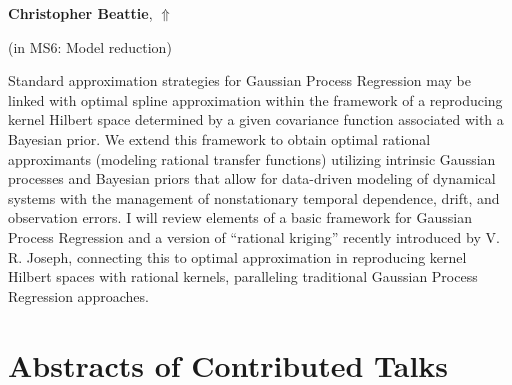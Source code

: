 \documentclass[ILAS2025-program.tex]{subfiles}
\begin{document}
     \hypertarget{down0211}{}\begin{ilasabstract}
    
    \textbf{Christopher Beattie},  \hfill \hyperlink{up0211}{$\Uparrow$}
    
    (in {\color{mstitle}MS6: Model reduction})
        
        \mtskip
    Standard approximation strategies for Gaussian Process Regression may be linked with optimal spline approximation within the framework of a reproducing kernel Hilbert space determined by a given covariance function associated with a Bayesian prior.   We extend this framework to obtain optimal rational approximants (modeling rational transfer functions) utilizing intrinsic Gaussian processes and Bayesian priors that allow for data-driven modeling of dynamical systems with the management of nonstationary temporal dependence, drift, and observation errors.  I will review elements of a basic framework for Gaussian Process Regression and a version of ``rational kriging'' recently introduced by V. R. Joseph,  connecting this to optimal approximation in reproducing kernel Hilbert spaces with rational kernels, paralleling traditional Gaussian Process Regression approaches.
\end{ilasabstract}
    \newpage

\section{Abstracts of Contributed Talks}
\newpage
\end{document}
